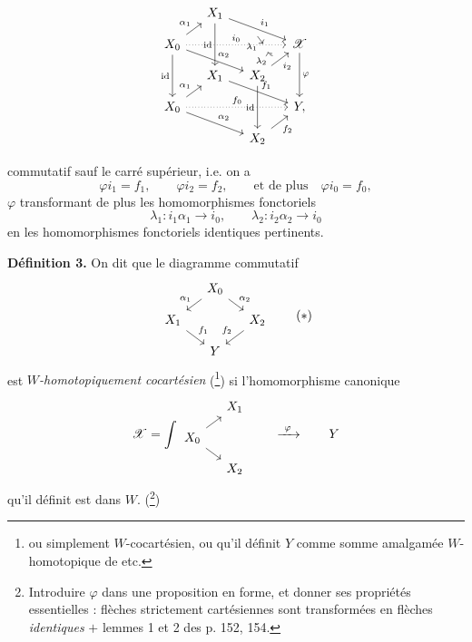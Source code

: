 \documentclass[11pt]{article}
\newcommand{\printedpage}[1]{\marginpar{\footnotesize p.~#1}}
\newcommand{\msp}[1]{\marginpar{\footnotesize [#1]}}
\newcommand{\sX}{\mathscr{X}}
\begin{document}
\msp{page 131}
\[
\begin{tikzcd}[row sep=small, column sep=small]
 & X_1 \arrow[dd, "\mathrm{id}"'] \arrow[rrd, "i_1", ""'{name=I1}] & & \\
X_0 \arrow[ru, "\alpha_1"] \arrow[rrr, dotted, "i_0", ""'{name=I0, pos=0.8}] \arrow[rrd, "\alpha_2"] \arrow[dd, "\mathrm{id}"'] & & & \sX \arrow[dd, "\varphi"] \\
 & X_1 \arrow[rrd, "f_1"] & X_2 \arrow[ru, "i_2"', ""{name=I2}] \arrow[dd, "\mathrm{id}"'] & \\
X_0 \arrow[ru, "\alpha_1"] \arrow[rrr, dotted, "f_0"] \arrow[rrd, "\alpha_2"] & & & Y, \\
 & & X_2 \arrow[ru, "f_2"'] &
\arrow[from=I1, to=I0, "\lambda_1"', shorten <=1pt, shorten >=1pt]
\arrow[from=I2, to=I0, dashed, bend left, "\lambda_2", shorten <=1pt, shorten >=1pt] %
\end{tikzcd}
\]

\printedpage{89}
commutatif sauf le carré supérieur, i.e. on a
\[
\varphi i_1 = f_1, \qquad \varphi i_2 = f_2, \qquad \text{et de plus} \quad \varphi i_0 = f_0,
\]
$\varphi$ transformant de plus les homomorphismes fonctoriels
\[
\lambda_1 : i_1\alpha_1 \longrightarrow i_0, \qquad \lambda_2 : i_2\alpha_2 \longrightarrow i_0
\]
en les homomorphismes fonctoriels identiques pertinents.

\setcounter{footnote}{85}
\textbf{Définition 3.} On dit que le diagramme commutatif
\[
\begin{tikzcd}[row sep=small, column sep=small]
 & X_0 \arrow[dl, "\alpha_1"'] \arrow[dr, "\alpha_2"] & \\
X_1 \arrow[dr, "f_1"] & & X_2 \arrow[dl, "f_2"'] \\
 & Y &
\end{tikzcd}
\tag*{$(*)$}
\]
est \textit{$W$-homotopiquement cocartésien} (\footnote{ou simplement $W$-cocartésien, ou qu'il définit $Y$ comme somme amalgamée $W$-homotopique de etc.}) si l'homomorphisme canonique
\[
\sX = \int
\begin{tikzcd}[row sep=small, column sep=small]
 & X_1 \\
X_0 \arrow[ur] \arrow[dr] & \\
 & X_2
\end{tikzcd}
\qquad \xrightarrow{\ \varphi\ } \qquad Y
\]
qu'il définit est dans $W$. (\footnote{Introduire $\varphi$ dans une proposition en forme, et donner ses propriétés essentielles : flèches strictement cartésiennes sont transformées en flèches \textit{identiques} $+$ lemmes 1 et 2 des p. 152, 154.})
\end{document}

